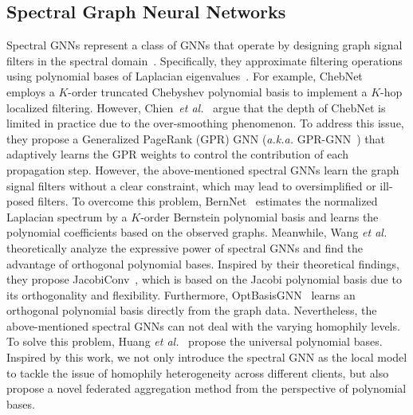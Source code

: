 \subsection{Spectral Graph Neural Networks}
Spectral GNNs represent a class of GNNs that operate by designing graph signal filters in the spectral domain~\cite{wang2022powerful}. Specifically, they approximate filtering operations using polynomial bases of Laplacian eigenvalues~\cite{guo2023graph}. For example, ChebNet~\cite{defferrard2016convolutional} employs a $K$-order truncated Chebyshev polynomial basis to implement a $K$-hop localized filtering. However, Chien~\textit{et al.}~\cite{chien2021adaptive} argue that the depth of ChebNet is limited in practice due to the over-smoothing phenomenon. To address this issue, they propose a Generalized PageRank (GPR) GNN (\textit{a.k.a.} GPR-GNN~\cite{chien2021adaptive}) that adaptively learns the GPR weights to control the contribution of each propagation step. However, the above-mentioned spectral GNNs learn the graph signal filters without a clear constraint, which may lead to oversimplified or ill-posed filters. To overcome this problem, BernNet~\cite{he2021bernnet} estimates the normalized Laplacian spectrum by a $K$-order Bernstein polynomial basis and learns the polynomial coefficients based on the observed graphs. Meanwhile, Wang \textit{et al.}~\cite{wang2022powerful} theoretically analyze the expressive power of spectral GNNs and find the advantage of orthogonal polynomial bases. Inspired by their theoretical findings, they propose JacobiConv~\cite{wang2022powerful}, which is based on the Jacobi polynomial basis due to its orthogonality and flexibility. Furthermore, OptBasisGNN~\cite{guo2023graph} learns an orthogonal polynomial basis directly from the graph data. Nevertheless, the above-mentioned spectral GNNs can not deal with the varying homophily levels. To solve this problem, Huang \textit{et al.}~\cite{huanguniversal} propose the universal polynomial bases. Inspired by this work, we not only introduce the spectral GNN as the local model to tackle the issue of homophily heterogeneity across different clients, but also propose a novel federated aggregation method from the perspective of polynomial bases.